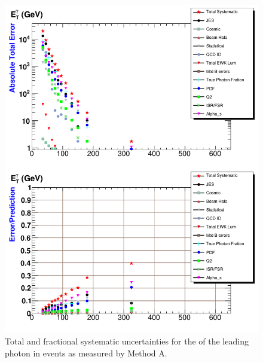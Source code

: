 \begin{figure}[p]
 \centering
 \includegraphics[scale=.7,keepaspectratio=true]{./G30Jets_Errs_MtdA_plot1_Et_pho.pdf}
 \caption{Total and fractional systematic uncertainties for the \et of the leading photon in \phoonejet events as measured by Method A.}
 \label{fig:g30Jets_Errs_MtdA_plot1_Et_pho}
\end{figure}

